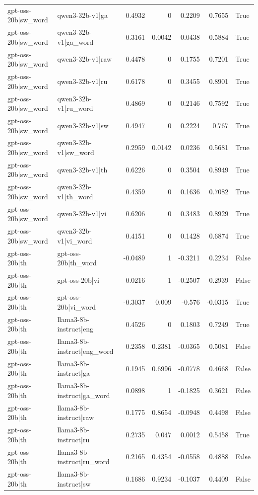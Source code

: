 \begin{table}
\begin{tabular}{l l r r r r l}
gpt-oss-20b|sw_word & qwen3-32b-v1|ga & 0.4932 & 0 & 0.2209 & 0.7655 & True \\
gpt-oss-20b|sw_word & qwen3-32b-v1|ga_word & 0.3161 & 0.0042 & 0.0438 & 0.5884 & True \\
gpt-oss-20b|sw_word & qwen3-32b-v1|raw & 0.4478 & 0 & 0.1755 & 0.7201 & True \\
gpt-oss-20b|sw_word & qwen3-32b-v1|ru & 0.6178 & 0 & 0.3455 & 0.8901 & True \\
gpt-oss-20b|sw_word & qwen3-32b-v1|ru_word & 0.4869 & 0 & 0.2146 & 0.7592 & True \\
gpt-oss-20b|sw_word & qwen3-32b-v1|sw & 0.4947 & 0 & 0.2224 & 0.767 & True \\
gpt-oss-20b|sw_word & qwen3-32b-v1|sw_word & 0.2959 & 0.0142 & 0.0236 & 0.5681 & True \\
gpt-oss-20b|sw_word & qwen3-32b-v1|th & 0.6226 & 0 & 0.3504 & 0.8949 & True \\
gpt-oss-20b|sw_word & qwen3-32b-v1|th_word & 0.4359 & 0 & 0.1636 & 0.7082 & True \\
gpt-oss-20b|sw_word & qwen3-32b-v1|vi & 0.6206 & 0 & 0.3483 & 0.8929 & True \\
gpt-oss-20b|sw_word & qwen3-32b-v1|vi_word & 0.4151 & 0 & 0.1428 & 0.6874 & True \\
gpt-oss-20b|th & gpt-oss-20b|th_word & -0.0489 & 1 & -0.3211 & 0.2234 & False \\
gpt-oss-20b|th & gpt-oss-20b|vi & 0.0216 & 1 & -0.2507 & 0.2939 & False \\
gpt-oss-20b|th & gpt-oss-20b|vi_word & -0.3037 & 0.009 & -0.576 & -0.0315 & True \\
gpt-oss-20b|th & llama3-8b-instruct|eng & 0.4526 & 0 & 0.1803 & 0.7249 & True \\
gpt-oss-20b|th & llama3-8b-instruct|eng_word & 0.2358 & 0.2381 & -0.0365 & 0.5081 & False \\
gpt-oss-20b|th & llama3-8b-instruct|ga & 0.1945 & 0.6996 & -0.0778 & 0.4668 & False \\
gpt-oss-20b|th & llama3-8b-instruct|ga_word & 0.0898 & 1 & -0.1825 & 0.3621 & False \\
gpt-oss-20b|th & llama3-8b-instruct|raw & 0.1775 & 0.8654 & -0.0948 & 0.4498 & False \\
gpt-oss-20b|th & llama3-8b-instruct|ru & 0.2735 & 0.047 & 0.0012 & 0.5458 & True \\
gpt-oss-20b|th & llama3-8b-instruct|ru_word & 0.2165 & 0.4354 & -0.0558 & 0.4888 & False \\
gpt-oss-20b|th & llama3-8b-instruct|sw & 0.1686 & 0.9234 & -0.1037 & 0.4409 & False \\

\end{tabular}
\end{table}
